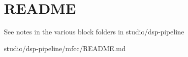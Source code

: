 \chapter{README}
\hypertarget{md__face___access__inferencing_2src_2edge-impulse-sdk_2dsp_2_r_e_a_d_m_e}{}\label{md__face___access__inferencing_2src_2edge-impulse-sdk_2dsp_2_r_e_a_d_m_e}
See notes in the various block folders in studio/dsp-\/pipeline

studio/dsp-\/pipeline/mfcc/\+README.\+md 